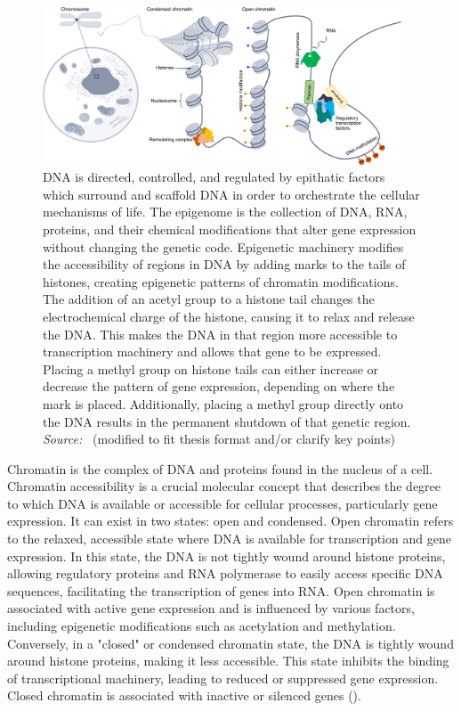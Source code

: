 \begin{figure}[!ht]
	\centering
	\includegraphics[width=0.95\textwidth]{chromatin_organization/fig}
	\vspace{0.1cm}
	\caption[DNA organization] {DNA is directed, controlled, and regulated by epithatic factors which surround and scaffold DNA in order to orchestrate the cellular mechanisms of life. The epigenome is the collection of DNA, RNA, proteins, and their chemical modifications that alter gene expression without changing the genetic code. Epigenetic machinery modifies the accessibility of regions in DNA by adding marks to the tails of histones, creating epigenetic patterns of chromatin modifications. The addition of an acetyl group to a histone tail changes the electrochemical charge of the histone, causing it to relax and release the DNA. This makes the DNA in that region more accessible to transcription machinery and allows that gene to be expressed. Placing a methyl group on histone tails can either increase or decrease the pattern of gene expression, depending on where the mark is placed. Additionally, placing a methyl group directly onto the DNA results in the permanent shutdown of that genetic region. \emph{Source:~\cite{heumos2023best}} (modified to fit thesis format and/or clarify key points)}
	\label{fig:chromatin_organization}
\end{figure}


Chromatin is the complex of DNA and proteins found in the nucleus of a cell. Chromatin accessibility is a crucial molecular concept that describes the degree to which DNA is available or accessible for cellular processes, particularly gene expression. It can exist in two states: open and condensed. Open chromatin refers to the relaxed, accessible state where DNA is available for transcription and gene expression. In this state, the DNA is not tightly wound around histone proteins, allowing regulatory proteins and RNA polymerase to easily access specific DNA sequences, facilitating the transcription of genes into RNA. Open chromatin is associated with active gene expression and is influenced by various factors, including epigenetic modifications such as acetylation and methylation. Conversely, in a "closed" or condensed chromatin state, the DNA is tightly wound around histone proteins, making it less accessible. This state inhibits the binding of transcriptional machinery, leading to reduced or suppressed gene expression. Closed chromatin is associated with inactive or silenced genes ().


